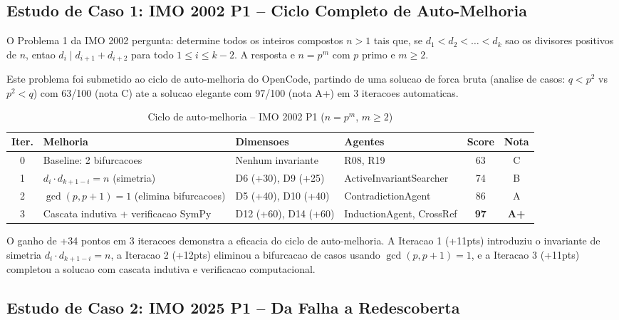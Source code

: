 \documentclass[5p]{elsarticle}
\begin{document}
\subsection{Estudo de Caso 1: IMO 2002 P1 -- Ciclo Completo de Auto-Melhoria}

O Problema 1 da IMO 2002 \cite{imo2002} pergunta: determine todos os inteiros
compostos $n>1$ tais que, se $d_1<d_2<\dots<d_k$ sao os divisores positivos de
$n$, entao $d_i\mid d_{i+1}+d_{i+2}$ para todo $1\leq i\leq k-2$. A resposta e
$n=p^m$ com $p$ primo e $m\geq 2$.

Este problema foi submetido ao ciclo de auto-melhoria do OpenCode, partindo de
uma solucao de forca bruta (analise de casos: $q<p^2$ vs $p^2<q$) com 63/100
(nota C) ate a solucao elegante com 97/100 (nota A+) em 3 iteracoes automaticas.

\begin{table}[H]
 \centering
 \caption{Ciclo de auto-melhoria -- IMO 2002 P1 ($n=p^m$, $m\geq 2$)}
 \label{tab:caso2002}
 \footnotesize
 \begin{tabular}{clp{3cm}p{3cm}cc}
 \toprule
 \textbf{Iter.} & \textbf{Melhoria} & \textbf{Dimensoes} & \textbf{Agentes} & \textbf{Score} & \textbf{Nota}\\
 \midrule
 0 & Baseline: 2 bifurcacoes & Nenhum invariante & R08, R19 & 63 & C\\
 \rowcolor{yellowbg}
 1 & $d_i\cdot d_{k+1-i}=n$ (simetria) & D6 (+30), D9 (+25) & ActiveInvariantSearcher & 74 & B\\
 2 & $\gcd(p,p+1)=1$ (elimina bifurcacoes) & D5 (+40), D10 (+40) & ContradictionAgent & 86 & A\\
 \rowcolor{greenbg}
 3 & Cascata indutiva + verificacao SymPy & D12 (+60), D14 (+60) & InductionAgent, CrossRef & \textbf{97} & \textbf{A+}\\
 \bottomrule
 \end{tabular}
\end{table}

O ganho de +34 pontos em 3 iteracoes demonstra a eficacia do ciclo de
auto-melhoria. A Iteracao 1 (+11pts) introduziu o invariante de simetria
$d_i\cdot d_{k+1-i}=n$, a Iteracao 2 (+12pts) eliminou a bifurcacao de
casos usando $\gcd(p,p+1)=1$, e a Iteracao 3 (+11pts) completou a solucao
com cascata indutiva e verificacao computacional.

\subsection{Estudo de Caso 2: IMO 2025 P1 -- Da Falha a Redescoberta}
\end{document}
